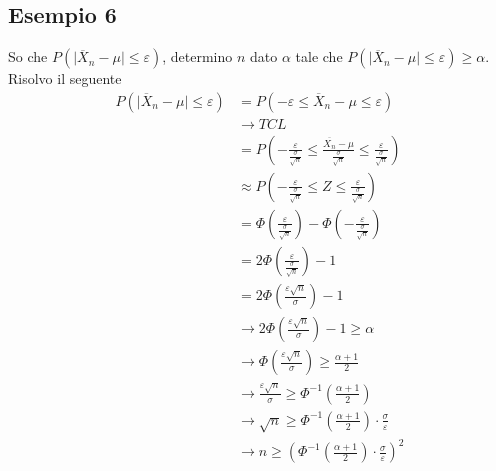 \documentclass[11pt]{report}
\begin{document}
\subsection{Esempio 6}
So che $P \left( \mid \overline{X}_n - \mu \mid \leq \varepsilon \right)$, determino $n$ dato $\alpha$ tale che $P \left( \mid \overline{X}_n - \mu \mid \leq \varepsilon \right) \geq \alpha$.
Risolvo il seguente
\begin{equation}
    \begin{split}
       P \left( \mid \overline{X}_n - \mu \mid \leq \varepsilon \right) & = P \left( -\varepsilon \leq \overline{X}_n - \mu \leq \varepsilon \right)\\
       & \rightarrow TCL\\
       & = P \left( -\frac{\varepsilon}{\frac{\sigma}{\sqrt{n}}} \leq \frac{\overline{X_n} - \mu}{\frac{\sigma}{\sqrt{n}}} \leq \frac{\varepsilon}{\frac{\sigma}{\sqrt{n}}} \right)\\
       & \approx P \left( -\frac{\varepsilon}{\frac{\sigma}{\sqrt{n}}} \leq Z \leq \frac{\varepsilon}{\frac{\sigma}{\sqrt{n}}} \right)\\
       & = \Phi \left( \frac{\varepsilon}{\frac{\sigma}{\sqrt{n}}} \right) - \Phi \left( -\frac{\varepsilon}{\frac{\sigma}{\sqrt{n}}} \right)\\
       & = 2\Phi \left( \frac{\varepsilon}{\frac{\sigma}{\sqrt{n}}} \right) - 1\\
       & = 2\Phi \left( \frac{\varepsilon\sqrt{n}}{\sigma} \right) - 1\\
       & \rightarrow 2\Phi \left( \frac{\varepsilon\sqrt{n}}{\sigma} \right) - 1 \geq \alpha\\
       & \rightarrow \Phi \left( \frac{\varepsilon\sqrt{n}}{\sigma} \right) \geq \frac{\alpha+1}{2}\\
       & \rightarrow \frac{\varepsilon\sqrt{n}}{\sigma} \geq \Phi^{-1} \left( \frac{\alpha+1}{2} \right)\\
       & \rightarrow \sqrt{n} \geq \Phi^{-1} \left( \frac{\alpha+1}{2} \right) \cdot \frac{\sigma}{\varepsilon}\\
       & \rightarrow n \geq \left( \Phi^{-1} \left( \frac{\alpha+1}{2} \right) \cdot \frac{\sigma}{\varepsilon} \right)^2
    \end{split}
\end{equation}
\end{document}
